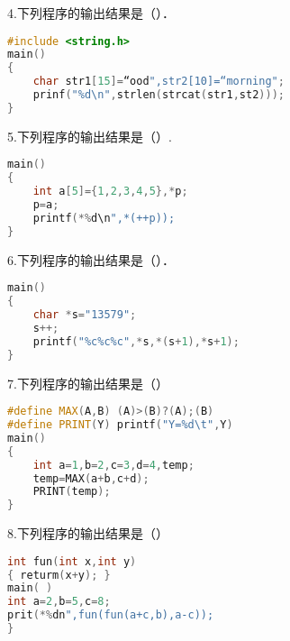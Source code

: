 4.下列程序的输出结果是（）．
\begin{lstlisting}[language=cpp]
#include <string.h>
main()
{
    char str1[15]=“ood",str2[10]=“morning";
    prinf("%d\n",strlen(strcat(str1,st2)));
}
\end{lstlisting}

5.下列程序的输出结果是（）.
\begin{lstlisting}[language=cpp]
main()
{
    int a[5]={1,2,3,4,5},*p;
    p=a;
    printf(*%d\n",*(++p));
}
\end{lstlisting}

6.下列程序的输出结果是（）．
\begin{lstlisting}[language=cpp]
main()
{
    char *s="13579";
    s++;
    printf("%c%c%c",*s,*(s+1),*s+1);
}
\end{lstlisting}

7.下列程序的输出结果是（）
\begin{lstlisting}[language=cpp]
#define MAX(A,B) (A)>(B)?(A);(B)
#define PRINT(Y) printf("Y=%d\t",Y)
main()
{
    int a=1,b=2,c=3,d=4,temp;
    temp=MAX(a+b,c+d);
    PRINT(temp);
}
\end{lstlisting}

8.下列程序的输出结果是（）
\begin{lstlisting}[language=cpp]
int fun(int x,int y)
{ returm(x+y); }
main( )
int a=2,b=5,c=8;
prit(*%dn",fun(fun(a+c,b),a-c));
}
\end{lstlisting}
